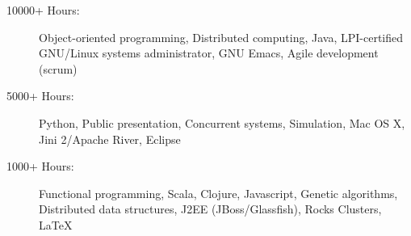 \documentclass[11pt]{article}
\begin{document}
\begin{description}
\item[10000+ Hours:] Object-oriented programming, Distributed computing, Java,
    LPI-certified GNU/Linux systems administrator, GNU Emacs, Agile
    development (scrum)
\item[5000+ Hours:] Python, Public presentation, Concurrent systems,
    Simulation, Mac OS X, Jini 2/Apache River, Eclipse
\item[1000+ Hours:] Functional programming, Scala, Clojure, Javascript,
    Genetic algorithms, Distributed data structures, J2EE
    (JBoss/Glassfish), Rocks Clusters, \LaTeX{}
\end{description}
\end{document}

